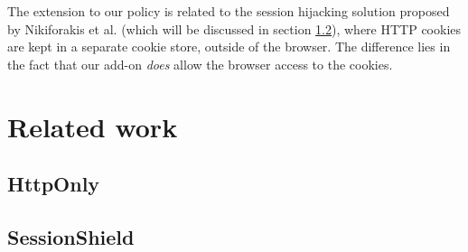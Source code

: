 The extension to our policy is related to the session hijacking solution proposed by Nikiforakis et al. \cite{Nikiforakis2010} (which will be discussed in section \ref{sessionshield}), where HTTP cookies are kept in a separate cookie store, outside of the browser. The difference lies in the fact that our add-on \emph{does} allow the browser access to the cookies.

\section{Related work}\label{related-work}

\subsection{HttpOnly}\label{httponly}

\subsection{SessionShield}\label{sessionshield}
